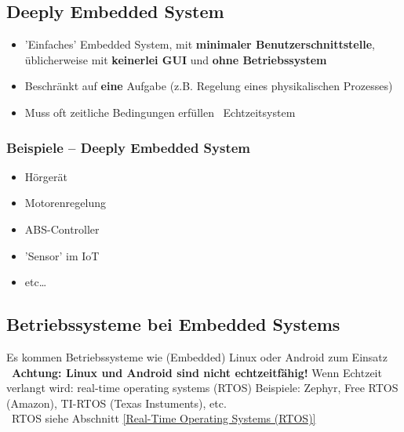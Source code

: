 \subsection{Deeply Embedded System}

\begin{itemize}
    \item 'Einfaches' Embedded System, mit \textbf{minimaler Benutzerschnittstelle}, üblicherweise mit \textbf{keinerlei GUI}
        und \textbf{ohne Betriebssystem}
    \item Beschränkt auf \textbf{eine} Aufgabe (z.B. Regelung eines physikalischen Prozesses)
    \item Muss oft zeitliche Bedingungen erfüllen \textrightarrow\ Echtzeitsystem
\end{itemize}


\subsubsection{Beispiele -- Deeply Embedded System}

\begin{minipage}[t]{0.3\columnwidth}
    \begin{itemize}
        \item Hörgerät
        \item Motorenregelung
    \end{itemize}
\end{minipage}
\hfill
\begin{minipage}[t]{0.3\columnwidth}
    \begin{itemize}
        \item ABS-Controller
        \item 'Sensor' im IoT
    \end{itemize}
\end{minipage}
\hfill
\begin{minipage}[t]{0.3\columnwidth}
    \begin{itemize}
        \item etc\ldots
    \end{itemize}
\end{minipage}


\subsection{Betriebssysteme bei Embedded Systems}

\begin{outline}
    \1 Es kommen Betriebssysteme wie (Embedded) Linux oder Android zum Einsatz \\
        \textrightarrow\ \textbf{Achtung: Linux und Android sind nicht echtzeitfähig!}
    \1 Wenn Echtzeit verlangt wird: real-time operating systems (RTOS)
        \2 Beispiele: Zephyr, Free RTOS (Amazon), TI-RTOS (Texas Instuments), etc. \\
            \textrightarrow\ RTOS siehe Abschnitt \ref{Real-Time Operating Systems (RTOS)}
\end{outline}


